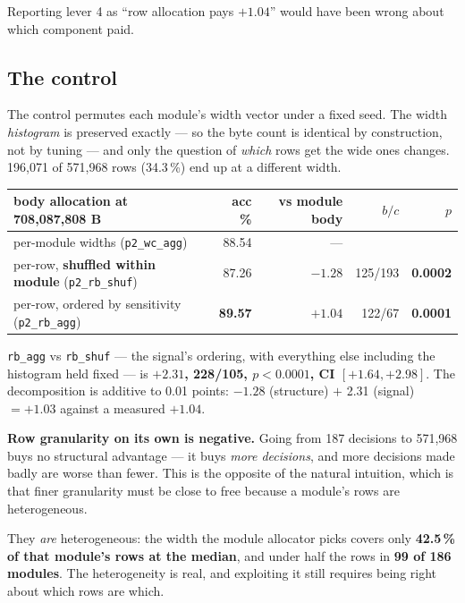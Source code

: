 \documentclass[11pt]{article}
\newcommand{\pct}{\,\%}
\newcommand{\code}[1]{\texttt{#1}}
\newcommand{\best}[1]{\textbf{#1}}
\newenvironment{aside}%
{\par\needspace{4\baselineskip}\vspace{0.8ex}%
\begin{lrbox}{\asidebox}\begin{minipage}{\dimexpr\textwidth-18pt\relax}\small}%
{\end{minipage}\end{lrbox}%
\noindent\setlength{\fboxsep}{9pt}\colorbox{warnbg}{\usebox{\asidebox}}%
\vspace{0.6ex}\par}
\begin{document}
Reporting lever 4 as ``row allocation pays $+1.04$'' would have been wrong about which component
paid.

\subsection{The control}

The control permutes each module's width vector under a fixed seed. The width \emph{histogram} is
preserved exactly --- so the byte count is identical by construction, not by tuning --- and only
the question of \emph{which} rows get the wide ones changes. 196{,}071 of 571{,}968 rows
(34.3\pct) end up at a different width.

\begin{center}\small
\begin{tabular}{@{}lrrrr@{}}
\toprule
body allocation at 708{,}087{,}808 B & acc \% & vs module body & $b/c$ & $p$ \\
\midrule
per-module widths (\code{p2\_wc\_agg}) & 88.54 & --- & & \\
\rowcolor{ctlbg}
per-row, \textbf{shuffled within module} (\code{p2\_rb\_shuf}) & 87.26 & \best{$-1.28$} & 125/193 & \best{0.0002} \\
\rowcolor{winbg}
per-row, ordered by sensitivity (\code{p2\_rb\_agg}) & \best{89.57} & \best{$+1.04$} & 122/67 & \best{0.0001} \\
\bottomrule
\end{tabular}
\end{center}

\code{rb\_agg} vs \code{rb\_shuf} --- the signal's ordering, with everything else including the
histogram held fixed --- is \best{$+2.31$, 228/105, $p < 0.0001$, CI $[+1.64, +2.98]$}. The
decomposition is additive to 0.01 points: $-1.28$ (structure) $+$ 2.31 (signal) $= +1.03$ against
a measured $+1.04$.

\begin{aside}
\textbf{Row granularity on its own is negative.} Going from 187 decisions to 571{,}968 buys no
structural advantage --- it buys \emph{more decisions}, and more decisions made badly are worse
than fewer. This is the opposite of the natural intuition, which is that finer granularity must be
close to free because a module's rows are heterogeneous.
\end{aside}

They \emph{are} heterogeneous: the width the module allocator picks covers only \textbf{42.5\pct{}
of that module's rows at the median}, and under half the rows in \textbf{99 of 186 modules}. The
heterogeneity is real, and exploiting it still requires being right about which rows are which.
\end{document}

